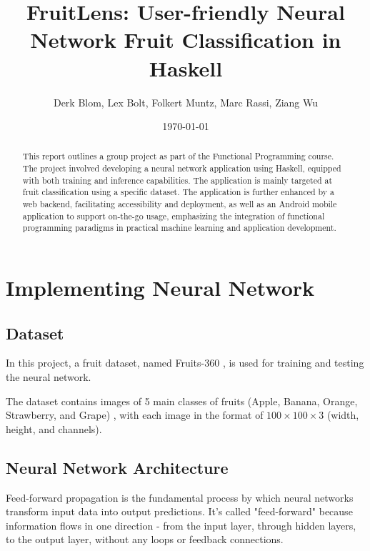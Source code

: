 \documentclass[12pt,a4paper]{article}
\title{FruitLens: User-friendly Neural Network Fruit Classification in Haskell}
\author{Derk Blom, Lex Bolt, Folkert Muntz, Marc Rassi, Ziang Wu}
\date{\today}
\begin{document}
\maketitle

\begin{abstract}
This report outlines a group project as part of the Functional Programming course. The project involved developing a neural network application using Haskell, equipped with both training and inference capabilities. The application is mainly targeted at fruit classification using a specific dataset. The application is further enhanced by a web backend, facilitating accessibility and deployment, as well as an Android mobile application to support on-the-go usage, emphasizing the integration of functional programming paradigms in practical machine learning and application development.
\end{abstract}

\vfill

\tableofcontents

\clearpage


\section{Implementing Neural Network}

\subsection{Dataset}
In this project, a fruit dataset, named Fruits-360 \cite{oltean_fruits-360_2017}, is used for training and testing the neural network.

The dataset contains images of 5 main classes of fruits (Apple, Banana, Orange, Strawberry, and Grape) , with each image in the format of $100 \times 100 \times 3$ (width, height, and channels).

% 

\subsection{Neural Network Architecture}
Feed-forward propagation is the fundamental process by which neural networks transform input data into output predictions. It's called "feed-forward" because information flows in one direction - from the input layer, through hidden layers, to the output layer, without any loops or feedback connections.
\end{document}
